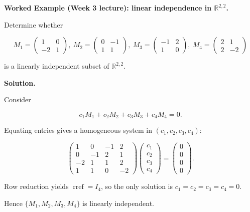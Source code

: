 \begin{examplebox}

\textbf{Worked Example (Week 3 lecture): linear independence in $\mathbb{R}^{2,2}$.}

Determine whether

\[
M_1=\begin{pmatrix}1&0\\-2&1\end{pmatrix},\
M_2=\begin{pmatrix}0&-1\\1&1\end{pmatrix},\
M_3=\begin{pmatrix}-1&2\\1&0\end{pmatrix},\
M_4=\begin{pmatrix}2&1\\2&-2\end{pmatrix}
\]

is a linearly independent subset of $\mathbb{R}^{2,2}$.

\medskip

\textbf{Solution.}

Consider

\[
c_1M_1+c_2M_2+c_3M_3+c_4M_4=0.
\]

Equating entries gives a homogeneous system in $(c_1,c_2,c_3,c_4)$:

\[
\begin{pmatrix}
1 & 0 & -1 & 2\\
0 & -1 & 2 & 1\\
-2 & 1 & 1 & 2\\
1 & 1 & 0 & -2
\end{pmatrix}
\begin{pmatrix}c_1\\c_2\\c_3\\c_4\end{pmatrix}
=
\begin{pmatrix}0\\0\\0\\0\end{pmatrix}.
\]

Row reduction yields $\operatorname{rref}=I_4$, so the only solution is $c_1=c_2=c_3=c_4=0$.

Hence $\{M_1,M_2,M_3,M_4\}$ is linearly independent.

\end{examplebox}


